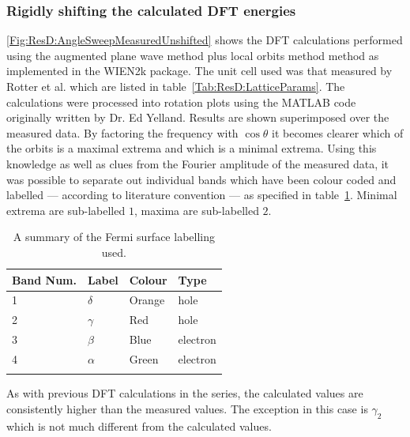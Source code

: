 \clearpage

\subsubsection{Rigidly shifting the calculated DFT energies}
    \label{Sec:ResD:DFTShifts}

\Fig\ref{Fig:ResD:AngleSweepMeasuredUnshifted} shows the DFT calculations performed using the augmented plane wave method plus local orbits method method as implemented in the WIEN2k package\cite{Blaha2001}. The unit cell used was that measured by Rotter et al. which are listed in table~\ref{Tab:ResD:LatticeParams}. The calculations were processed into rotation plots using the MATLAB code originally written by Dr. Ed Yelland. Results are shown superimposed over the measured data. By factoring the frequency with $\cos{\theta}$ it becomes clearer which of the orbits is a maximal extrema and which is a minimal extrema. Using this knowledge as well as clues from the Fourier amplitude of the measured data, it was possible to separate out individual bands which have been colour coded and labelled --- according to literature convention --- as specified in table~\ref{Tab:ResD:BandNaming}. Minimal extrema are sub-labelled $1$, maxima are sub-labelled $2$.
\begin{table}
    \begin{center}
        \caption{A summary of the Fermi surface labelling used.}
        \begin{tabular}[htbp]{llll}
\toprule
Band Num.  & Label & Colour    & Type \\
\midrule
1   & $\delta$  & Orange    & hole \\
2   & $\gamma$  & Red   & hole \\
3   & $\beta$   & Blue  & electron \\
4   & $\alpha$  & Green & electron \\
\bottomrule
        \label{Tab:ResD:BandNaming}
        \end{tabular}
    \end{center}
\end{table}
As with previous DFT calculations in the \BaFePAs series, the calculated values are consistently higher than the measured values. The exception in this case is $\gamma_2$ which is not much different from the calculated values.

